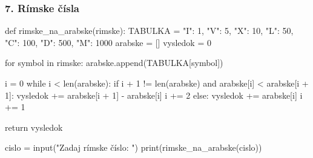 \subsubsection*{7. Rímske čísla}
\begin{solution}
def rimske_na_arabske(rimske):
    TABULKA = {"I": 1, "V": 5, "X": 10, "L": 50, "C": 100, "D": 500, "M": 1000}
    arabske = []
    vysledok = 0

    for symbol in rimske:
        arabske.append(TABULKA[symbol])

    i = 0
    while i < len(arabske):
        if i + 1 != len(arabske) and arabske[i] < arabske[i + 1]:
            vysledok += arabske[i + 1] - arabske[i]
            i += 2
        else:
            vysledok += arabske[i]
            i += 1

    return vysledok


cislo = input("Zadaj rímske číslo: ")
print(rimske_na_arabske(cislo))
\end{solution}


